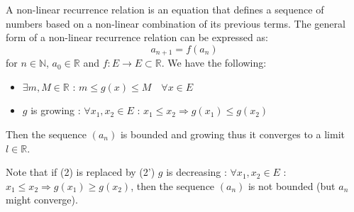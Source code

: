 \begin{definition}
    A non-linear recurrence relation is an equation that defines a sequence of numbers based on a non-linear combination of its previous terms. The general form of a non-linear recurrence relation can be expressed as:
    \[
        a_{n + 1} = f(a_n)
    \]
    for \( n \in \mathbb{N} \), \( a_0 \in \mathbb{R} \) and \( f : E \to E \subset \mathbb{R} \). We have the following:
    \begin{itemize}[itemsep=1pt,label=$\circ$]
        \item $\exists m, M \in \mathbb{R}$ : $m \leq g(x) \leq M \quad \forall x \in E$
        \item $g$ is growing : $\forall x_1, x_2 \in E$ : $x_1 \leq x_2 \Rightarrow g(x_1) \leq g(x_2)$
    \end{itemize}
    Then the sequence $(a_n)$ is bounded and growing thus it converges to a limit $l \in \mathbb{R}$.
\end{definition}
Note that if (2) is replaced by (2') $g$ is decreasing : $\forall x_1, x_2 \in E$ : $x_1 \leq x_2 \Rightarrow g(x_1) \geq g(x_2)$, then the sequence $(a_n)$ is not bounded (but $a_n$ might converge).

